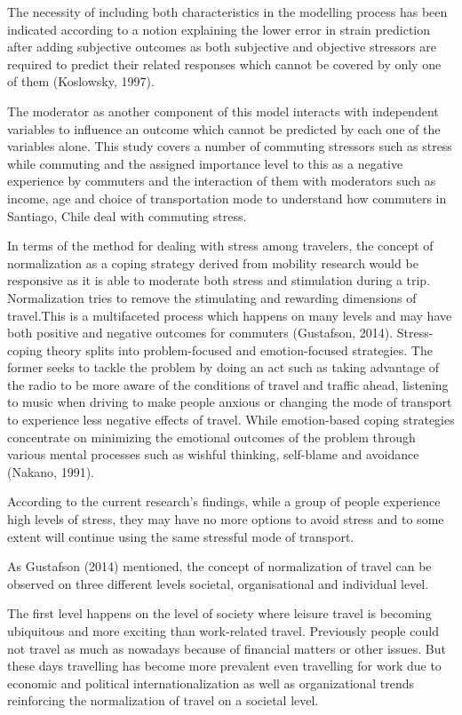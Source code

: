 \documentclass[
11pt, %
oneside, %
english, %
singlespacing, %
]{macthesis} %
\begin{document}
The necessity of including both characteristics in the modelling process has been indicated according to a notion explaining the lower error in strain prediction after adding subjective outcomes as both subjective and objective stressors are required to predict their related responses which cannot be covered by only one of them (Koslowsky, 1997).

The moderator as another component of this model interacts with independent variables to influence an outcome which cannot be predicted by each one of the variables alone. This study covers a number of commuting stressors such as stress while commuting and the assigned importance level to this as a negative experience by commuters and the interaction of them with moderators such as income, age and choice of transportation mode to understand how commuters in Santiago, Chile deal with commuting stress.

In terms of the method for dealing with stress among travelers, the concept of normalization as a coping strategy derived from mobility research would be responsive as it is able to moderate both stress and stimulation during a trip. Normalization tries to remove the stimulating and rewarding dimensions of travel.This is a multifaceted process which happens on many levels and may have both positive and negative outcomes for commuters (Gustafson, 2014).
Stress-coping theory splits into problem-focused and emotion-focused strategies. The former seeks to tackle the problem by doing an act such as taking advantage of the radio to be more aware of the conditions of travel and traffic ahead, listening to music when driving to make people anxious or changing the mode of transport to experience less negative effects of travel. While emotion-based coping strategies concentrate on minimizing the emotional outcomes of the problem through various mental processes such as wishful thinking, self-blame and avoidance (Nakano, 1991).

According to the current research's findings, while a group of people experience high levels of stress, they may have no more options to avoid stress and to some extent will continue using the same stressful mode of transport.

As Gustafson (2014) mentioned, the concept of normalization of travel can be observed on three different levels societal, organisational and individual level.

The first level happens on the level of society where leisure travel is becoming ubiquitous and more exciting than work-related travel. Previously people could not travel as much as nowadays because of financial matters or other issues. But these days travelling has become more prevalent even travelling for work due to economic and political internationalization as well as organizational trends reinforcing the normalization of travel on a societal level.
\end{document}
